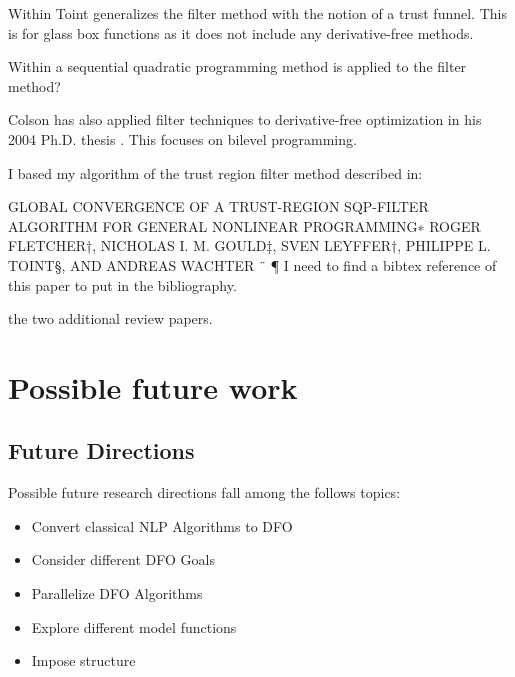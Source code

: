 \documentclass{article}
\begin{document}
Within \cite{DUMMY:trust_funnel_dfo} Toint generalizes the filter method with the notion of a trust funnel. This is for glass box functions as it does not include any derivative-free methods.


Within \cite{DUMMY:sqp_filter} a sequential quadratic programming method is applied to the filter method?


Colson has also applied filter techniques to derivative-free optimization in his 2004 Ph.D. thesis \cite{Colson2004}. This focuses on bilevel programming.


I based my algorithm of the trust region filter method described in:

GLOBAL CONVERGENCE OF A TRUST-REGION SQP-FILTER
ALGORITHM FOR GENERAL NONLINEAR PROGRAMMING∗
ROGER FLETCHER†, NICHOLAS I. M. GOULD‡, SVEN LEYFFER†,
PHILIPPE L. TOINT§, AND ANDREAS WACHTER ¨ ¶
I need to find a bibtex reference of this paper to put in the bibliography.




the two additional review papers.



\section{Possible future work}

\subsection{Future Directions}

Possible future research directions fall among the follows topics:

\begin{itemize}
\item Convert classical NLP Algorithms to DFO
\item Consider different DFO Goals
\item Parallelize DFO Algorithms
\item Explore different model functions
\item Impose structure
\end{itemize}
\end{document}
